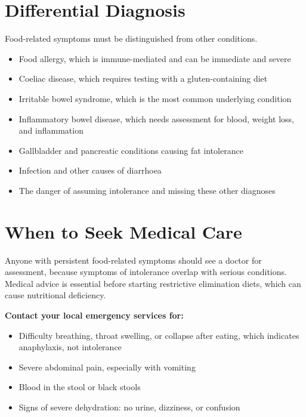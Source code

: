 \section*{Differential Diagnosis}
Food-related symptoms must be distinguished from other conditions.
\begin{itemize}
    \item Food allergy, which is immune-mediated and can be immediate and severe
    \item Coeliac disease, which requires testing with a gluten-containing diet
    \item Irritable bowel syndrome, which is the most common underlying condition
    \item Inflammatory bowel disease, which needs assessment for blood, weight loss, and inflammation
    \item Gallbladder and pancreatic conditions causing fat intolerance
    \item Infection and other causes of diarrhoea
    \item The danger of assuming intolerance and missing these other diagnoses
\end{itemize}

\section*{When to Seek Medical Care}
Anyone with persistent food-related symptoms should see a doctor for assessment, because symptoms of intolerance overlap with serious conditions. Medical advice is essential before starting restrictive elimination diets, which can cause nutritional deficiency.

\textbf{Contact your local emergency services for:}
\begin{itemize}
    \item Difficulty breathing, throat swelling, or collapse after eating, which indicates anaphylaxis, not intolerance
    \item Severe abdominal pain, especially with vomiting
    \item Blood in the stool or black stools
    \item Signs of severe dehydration: no urine, dizziness, or confusion
\end{itemize}

